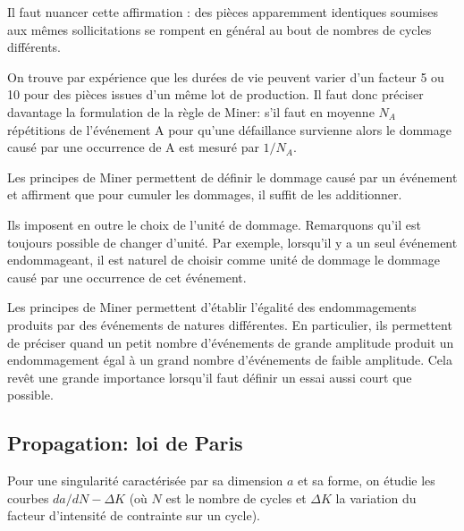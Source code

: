 \medskip
{}

Il faut nuancer cette affirmation : des pièces apparemment identiques soumises aux mêmes
sollicitations se rompent en général au bout de nombres de cycles différents.

 On trouve par expérience que les durées de vie
peuvent varier d'un facteur 5 ou 10 pour des pièces issues d'un même lot de production.
Il faut donc préciser davantage la formulation de la règle de Miner:
s'il faut en moyenne $N_A$  répétitions de l'événement A pour qu'une défaillance survienne
alors le dommage causé par une occurrence de A est mesuré par $1 / N_A$.

\medskip
Les principes de Miner permettent de définir le dommage causé par un événement
et affirment  que pour cumuler les dommages, il suffit de les additionner.

Ils imposent en outre le choix de l'unité
de dommage. Remarquons qu'il est toujours possible de changer d'unité. Par exemple, lorsqu'il y a
un seul événement endommageant, il est naturel de choisir comme unité de dommage le dommage
causé par une occurrence de cet événement.

\medskip
Les principes de Miner permettent d'établir l'égalité des endommagements produits par des
événements de natures différentes. En particulier, ils permettent de préciser quand un petit nombre
d'événements de grande amplitude produit un endommagement égal à un grand nombre
d'événements de faible amplitude. Cela revêt une grande importance lorsqu'il faut définir
un essai aussi court que possible.



\medskip
\subsection{Propagation: loi de Paris}

\medskip
Pour une singularité caractérisée par sa dimension $a$ et sa forme, on étudie les courbes
$da/dN - \Delta K$ (où $N$ est le nombre de cycles et $\Delta K$ la variation du facteur
d'intensité de contrainte sur un cycle).

\medskip
{}

